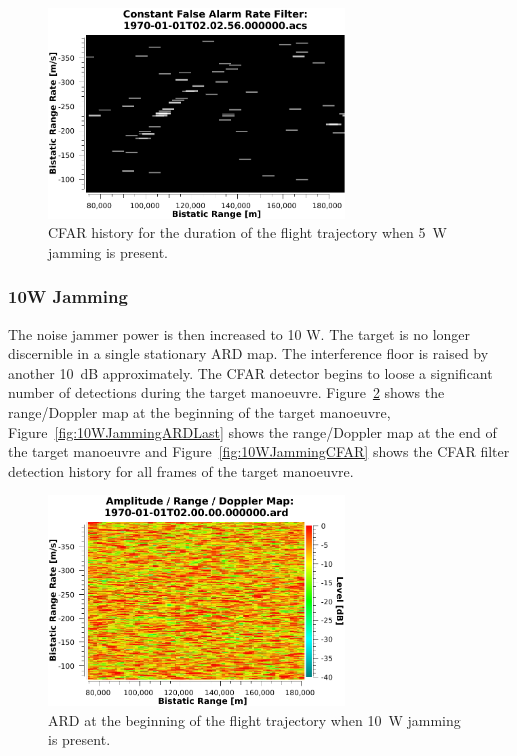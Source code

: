 \documentclass[english, 12pt]{report}
\begin{document}
\begin{figure}[htbp]
\begin{center}
\includegraphics[width=0.7\textwidth]{figs/Simulations/5WJammingCFAR.pdf}
\caption{CFAR history for the duration of the flight trajectory when 5~W jamming is present.}
\label{fig:5WJammingARDCFAR}
\end{center}
\end{figure}

\clearpage

\subsubsection{10W Jamming}\label{sec:Jam10W}
The noise jammer power is then increased to 10 W. The target is no longer discernible in a single stationary ARD map. The interference floor is raised by another 10~dB approximately. The CFAR detector begins to loose a significant number of detections during the target manoeuvre. Figure~\ref{fig:10WJammingARDFirst} shows the range/Doppler map at the beginning of the target manoeuvre, Figure~\ref{fig:10WJammingARDLast} shows the range/Doppler map at the end of the target manoeuvre and Figure~\ref{fig:10WJammingCFAR} shows the CFAR filter detection history for all frames of the target manoeuvre.

\begin{figure}[htbp]
\begin{center}
\includegraphics[width=0.7\textwidth]{figs/Simulations/10WJammingARDFirst.pdf}
\caption{ARD at the beginning of the flight trajectory when 10~W jamming is present.}
\label{fig:10WJammingARDFirst}
\end{center}
\end{figure}
\end{document}
